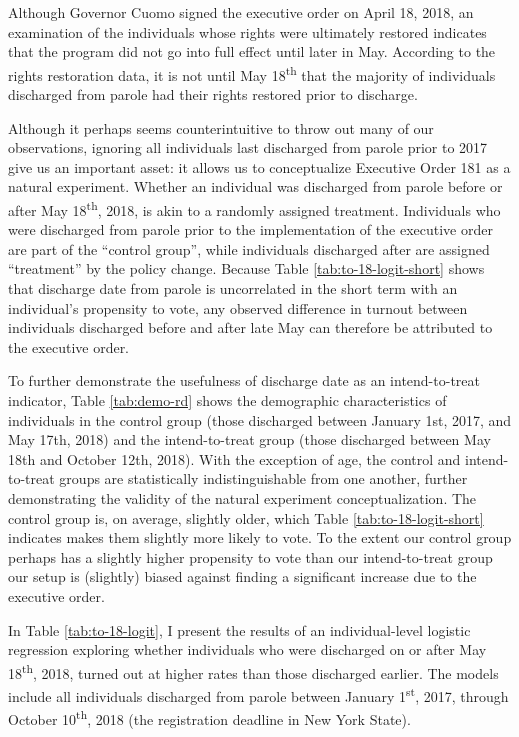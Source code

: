 \documentclass[
  12pt,
]{article}
\begin{document}
Although Governor Cuomo signed the executive order on April 18, 2018, an examination of the individuals whose rights were ultimately restored indicates that the program did not go into full effect until later in May. According to the rights restoration data, it is not until May 18\textsuperscript{th} that the majority of individuals discharged from parole had their rights restored prior to discharge.

Although it perhaps seems counterintuitive to throw out many of our observations, ignoring all individuals last discharged from parole prior to 2017 give us an important asset: it allows us to conceptualize Executive Order 181 as a natural experiment. Whether an individual was discharged from parole before or after May 18\textsuperscript{th}, 2018, is akin to a randomly assigned treatment. Individuals who were discharged from parole prior to the implementation of the executive order are part of the ``control group'', while individuals discharged after are assigned ``treatment'' by the policy change. Because Table \ref{tab:to-18-logit-short} shows that discharge date from parole is uncorrelated in the short term with an individual's propensity to vote, any observed difference in turnout between individuals discharged before and after late May can therefore be attributed to the executive order.

To further demonstrate the usefulness of discharge date as an intend-to-treat indicator, Table \ref{tab:demo-rd} shows the demographic characteristics of individuals in the control group (those discharged between January 1st, 2017, and May 17th, 2018) and the intend-to-treat group (those discharged between May 18th and October 12th, 2018). With the exception of age, the control and intend-to-treat groups are statistically indistinguishable from one another, further demonstrating the validity of the natural experiment conceptualization. The control group is, on average, slightly older, which Table \ref{tab:to-18-logit-short} indicates makes them slightly more likely to vote. To the extent our control group perhaps has a slightly higher propensity to vote than our intend-to-treat group our setup is (slightly) biased against finding a significant increase due to the executive order.



In Table \ref{tab:to-18-logit}, I present the results of an individual-level logistic regression exploring whether individuals who were discharged on or after May 18\textsuperscript{th}, 2018, turned out at higher rates than those discharged earlier. The models include all individuals discharged from parole between January 1\textsuperscript{st}, 2017, through October 10\textsuperscript{th}, 2018 (the registration deadline in New York State).
\end{document}
